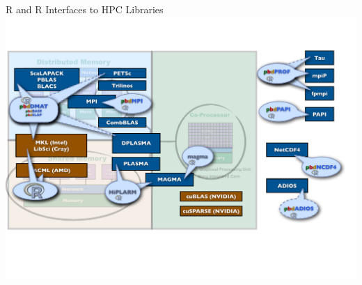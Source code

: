 \begin{frame}{R and \pbdR R Interfaces to HPC Libraries}
\includegraphics[height=\textheight]
{../common/pics/hardware/ParallelHardware26.pdf}
\end{frame}




